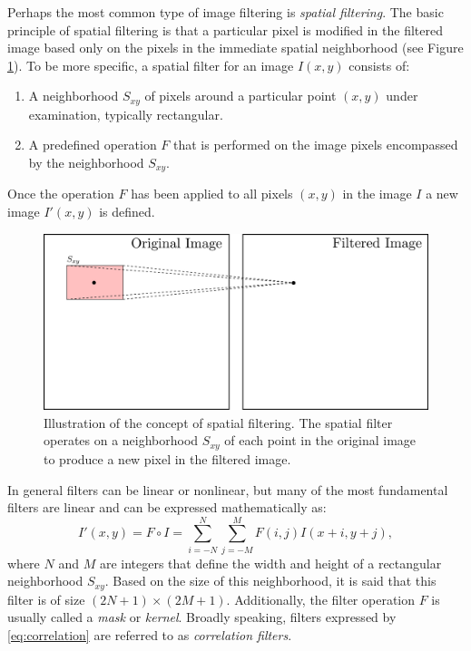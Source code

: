 Perhaps the most common type of image filtering is \textit{spatial filtering}.
The basic principle of spatial filtering is that a particular pixel is modified in the filtered image based only on the pixels in the immediate spatial neighborhood (see Figure \ref{fig:spatial_filter_concept_fig}). To be more specific, a spatial filter for an image $I(x,y)$ consists of:
\begin{enumerate}
    \item A neighborhood $S_{xy}$ of pixels around a particular point $(x,y)$ under examination, typically rectangular.
    \item A predefined operation $F$ that is performed on the image pixels encompassed by the neighborhood $S_{xy}$.
\end{enumerate}
Once the operation $F$ has been applied to all pixels $(x,y)$ in the image $I$ a new image $I'(x,y)$ is defined.
\begin{figure}[ht]
  \centering
  \includegraphics[width=.75\textwidth]{tex/figs/ch11_figs/spatialfiltering.png}
    \caption{Illustration of the concept of spatial filtering. The spatial filter operates on a neighborhood $S_{xy}$ of each point in the original image to produce a new pixel in the filtered image.}
    \label{fig:spatial_filter_concept_fig}
\end{figure}

In general filters can be linear or nonlinear, but many of the most fundamental filters are linear and can be expressed mathematically as:
\begin{equation}
  \label{eq:correlation}
    I'(x,y) = F \circ I = \sum_{i=-N}^N \sum_{j=-M}^M F(i,j)I(x+i,y+j),
\end{equation}
where $N$ and $M$ are integers that define the width and height of a rectangular neighborhood $S_{xy}$. Based on the size of this neighborhood, it is said that this filter is of size $(2N+1) \times (2M+1)$. Additionally, the filter operation $F$ is usually called a \textit{mask} or \textit{kernel}. Broadly speaking, filters expressed by \eqref{eq:correlation} are referred to as \textit{correlation filters}.

